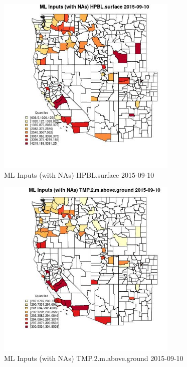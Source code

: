 \begin{figure} 
\centering  
\includegraphics[width=0.77\textwidth]{Code_Outputs/Report_ML_input_PM25_Step4_part_e_de_duplicated_aveswNAs_CountyHPBLsurfaceMean2015-09-10_2015-09-10.jpg} 
\caption{\label{fig:Report_ML_input_PM25_Step4_part_e_de_duplicated_aveswNAsCountyHPBLsurfaceMean2015-09-10_2015-09-10}ML Inputs (with NAs) HPBL.surface 2015-09-10} 
\end{figure} 
 

\begin{figure} 
\centering  
\includegraphics[width=0.77\textwidth]{Code_Outputs/Report_ML_input_PM25_Step4_part_e_de_duplicated_aveswNAs_CountyTMP2mabovegroundMean2015-09-10_2015-09-10.jpg} 
\caption{\label{fig:Report_ML_input_PM25_Step4_part_e_de_duplicated_aveswNAsCountyTMP2mabovegroundMean2015-09-10_2015-09-10}ML Inputs (with NAs) TMP.2.m.above.ground 2015-09-10} 
\end{figure} 
 

